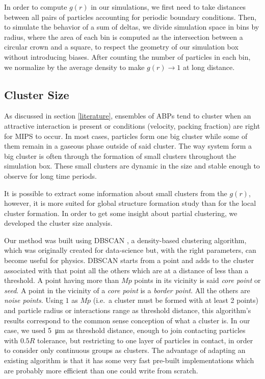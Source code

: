 \documentclass[../../master_thesis_np.tex]{subfiles}
\begin{document}
		In order to compute $g(r)$ in our simulations, we first need to take distances between all pairs of particles accounting for periodic boundary conditions.
		Then, to simulate the behavior of a sum of deltas, we divide simulation space in bins by radius, where the area of each bin is computed as the intersection between a circular crown and a square, to respect the geometry of our simulation box without introducing biases.
		After counting the number of particles in each bin, we normalize by the average density to make $g(r) \to 1$ at long distance.
		
		\subsection{Cluster Size}
		As discussed in section \ref{literature}, ensembles of ABPs tend to cluster when an attractive interaction is present or conditions (velocity, packing fraction) are right for MIPS to occur. 
		In most cases, particles form one big cluster while some of them remain in a gaseous phase outside of said cluster. 
		The way system form a big cluster is often through the formation of small clusters throughout the simulation box. These small clusters are dynamic in the size and stable enough to observe for long time periods.
		
		It is possible to extract some information about small clusters from the $g(r)$, however, it is more suited for global structure formation study than for the local cluster formation.
		In order to get some insight about partial clustering, we developed the cluster size analysis. 
		
		Our method was built using DBSCAN \cite{ester_density-based_1996}, a density-based clustering algorithm, which was originally created for data-science but, with the right parameters, can become useful for physics. 
		DBSCAN starts from a point and adds to the cluster associated with that point all the others which are at a distance of less than a threshold. 
		A point having more than $Mp$ points in its vicinity is said \emph{core point} or \emph{seed}. 
		A point in the vicinity of a \emph{core point} is a \emph{border point}. 
		All the others are \emph{noise points}. 
		Using $1$ as $Mp$ (i.e.\ a cluster must be formed with at least 2 points) and particle radius or interactions range as threshold distance, this algorithm's results correspond to the common sense conception of what a cluster is.
		In our case, we used \SI{5}{\um} as threshold distance, enough to join contacting particles with $0.5R$ tolerance, but restricting to one layer of particles in contact, in order to consider only continuous groups as clusters.
		The advantage of adapting an existing algorithm is that it has some very fast pre-built implementations which are probably more efficient than one could write from scratch.
		
\end{document}

